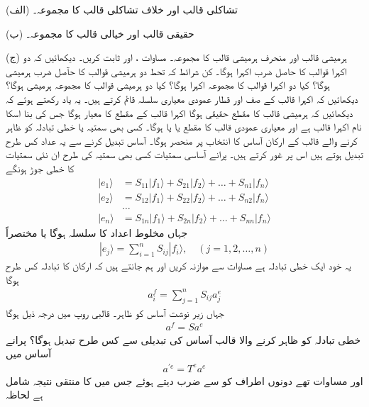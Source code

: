 (الف) تشاکلی قالب  اور خلاف تشاکلی قالب  کا مجموعہ۔

(ب) حقیقی قالب  اور خیالی قالب  کا مجموعہ۔

(ج) ہرمیشی قالب  اور منحرف ہرمیشی قالب  کا مجموعہ۔
مساوات ،  اور  ثابت کریں۔ دیکھائیں کہ دو اکہرا قوالب کا حاصل ضرب اکہرا ہوگا۔ کن شرائط کہ تحط دو ہرمیشی قوالب کا حآصل ضرب ہرمیشی ہوگا؟ کیا دو اکہرا قوالب کا مجموعہ اکہرا ہوگا؟ کیا دو ہرمیشی قوالب کا مجموعہ ہرمیشی ہوگا؟
دیکھائیں کہ اکہرا قالب کے صف اور قطار عمودی معیاری سلسلہ قائم کرتے ہیں۔
یہ یاد رکھتے ہوئے کہ  دیکھائیں کہ ہرمیشی قالب کا مقطع حقیقی ہوگا اکہرا قالب کے مقطع کا معیار  ہوگا جس کی بنا اسکا نام اکہرا قالب ہے اور معیاری عمودی قالب کا مقطع یا  یا  ہوگا۔
کسی بھی سمتیہ یا خطی تبادلہ کو ظاہر کرنے والے قالب کے ارکان آساس کا انتخاب پر منحصر ہوگا۔ آساس تبدیل کرنے سے یہ عداد کس طرح تبدیل ہوتے ہیں اس پر غور کرتے ہیں۔ پرانے آساسی سمتیات  کسی بھی سمتیہ کی طرح ان نئی سمتیات  کا خطی جوڑ ہونگے
\begin{align*}
	|e_1\rangle &= S_{11}|f_1\rangle + S_{21}|f_2\rangle + \dots + S_{n1}|f_n\rangle\\
	|e_2\rangle &= S_{12}|f_1\rangle + S_{22}|f_2\rangle +
	\dots + S_{n2}|f_n\rangle\\
	&\dots\\
	|e_n\rangle &= S_{1n}|f_1\rangle + S_{2n}|f_2\rangle + \dots + S_{nn}|f_n\rangle
\end{align*}
جہاں  مخلوط اعداد کا سلسلہ ہوگا یا مختصراً
\begin{align}
	|e_{j}\rangle = \sum_{i=1}^{n}S_{ij}|f_i\rangle,\quad(j=1, 2, \dots, n)
\end{align}
یہ خود ایک خطی تبادلہ ہے مساوات  سے موازنہ کریں اور ہم جانتے ہیں کہ ارکان کا تبادلہ کس طرح ہوگا
\begin{align}
	a_i^f = \sum_{j=1}^{n}S_{ij}a_j^e
\end{align}
جہاں زیر نوشت آساس کو ظاہر۔ قالبی روپ میں درجہ ذیل ہوگا
\begin{align}
	a^f = Sa^e
\end{align}
خطی تبادلہ  کو ظاہر کرنے والا قالب آساس کی تبدیلی سے کس طرح تبدیل ہوگا؟ پرانے آساس میں 
\begin{align*}
	a^{'e} = T^ea^e
\end{align*}
اور مساوات  تھے دونوں اطراف کو  سے ضرب دیتے ہوئے جس میں  کا منتقی نتیجہ شامل ہے لحاظہ
